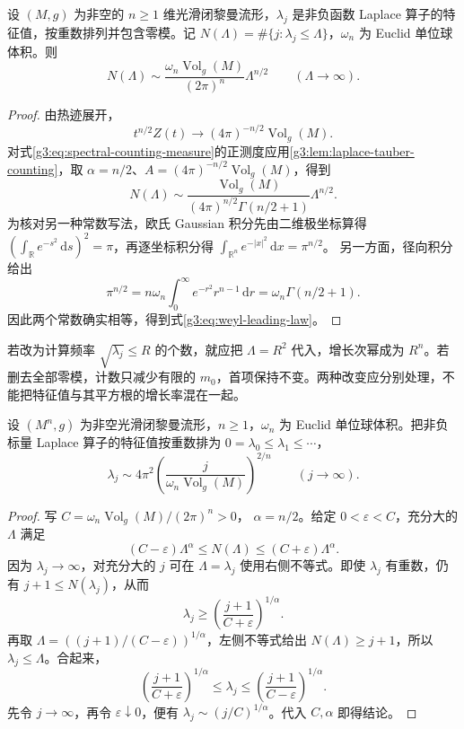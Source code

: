 \begin{theorem}\label{g3:thm:weyl-leading-law}
	设 \((M,g)\) 为非空的 \(n\ge1\) 维光滑闭黎曼流形，\(\lambda_j\) 是非负函数 Laplace 算子的特征值，按重数排列并包含零模。记 \(N(\Lambda)=\#\{j:\lambda_j\le\Lambda\}\)，\(\omega_n\) 为 Euclid 单位球体积。则
	\begin{equation}\label{g3:eq:weyl-leading-law}
		N(\Lambda)\sim
		\frac{\omega_n\operatorname{Vol}_g(M)}{(2\pi)^n}
		\Lambda^{n/2}
		\qquad(\Lambda\to\infty).
	\end{equation}
\end{theorem}
\begin{proof}
	由热迹展开，
	\[
		t^{n/2}Z(t)\longrightarrow
		(4\pi)^{-n/2}\operatorname{Vol}_g(M).
	\]
	对式\eqref{g3:eq:spectral-counting-measure}的正测度应用\cref{g3:lem:laplace-tauber-counting}，取
	\(\alpha=n/2\)、\(A=(4\pi)^{-n/2}\operatorname{Vol}_g(M)\)，得到
	\[
		N(\Lambda)\sim
		\frac{\operatorname{Vol}_g(M)}
		{(4\pi)^{n/2}\Gamma(n/2+1)}\Lambda^{n/2}.
	\]
	为核对另一种常数写法，欧氏 Gaussian 积分先由二维极坐标算得
	\((\int_{\mathbb R}e^{-s^2}\,\mathrm ds)^2=\pi\)，再逐坐标积分得
	\(\int_{\mathbb R^n}e^{-|x|^2}\,\mathrm dx=\pi^{n/2}\)。
	另一方面，径向积分给出
	\[
		\pi^{n/2}
		=n\omega_n\int_0^\infty e^{-r^2}r^{n-1}\,\mathrm dr
		=\omega_n\Gamma(n/2+1).
	\]
	因此两个常数确实相等，得到式\eqref{g3:eq:weyl-leading-law}。
\end{proof}

若改为计算频率 \(\sqrt{\lambda_j}\le R\) 的个数，就应把 \(\Lambda=R^2\) 代入，增长次幂成为 \(R^n\)。若删去全部零模，计数只减少有限的 \(m_0\)，首项保持不变。两种改变应分别处理，不能把特征值与其平方根的增长率混在一起。

\begin{corollary}\label{g3:cor:eigenvalue-weyl-growth}
	设 \((M^n,g)\) 为非空光滑闭黎曼流形，\(n\ge1\)，\(\omega_n\) 为 Euclid 单位球体积。把非负标量 Laplace 算子的特征值按重数排为 \(0=\lambda_0\le\lambda_1\le\cdots\)，
	\begin{equation}\label{g3:eq:eigenvalue-weyl-growth}
		\lambda_j\sim
		4\pi^2\left(\frac{j}{\omega_n\operatorname{Vol}_g(M)}\right)^{2/n}
		\qquad(j\to\infty).
	\end{equation}
\end{corollary}
\begin{proof}
	写 \(C=\omega_n\operatorname{Vol}_g(M)/(2\pi)^n>0\)，
	\(\alpha=n/2\)。给定 \(0<\varepsilon<C\)，充分大的 \(\Lambda\) 满足
	\[
		(C-\varepsilon)\Lambda^\alpha
		\le N(\Lambda)\le(C+\varepsilon)\Lambda^\alpha.
	\]
	因为 \(\lambda_j\to\infty\)，对充分大的 \(j\) 可在 \(\Lambda=\lambda_j\) 使用右侧不等式。即使 \(\lambda_j\) 有重数，仍有
	\(j+1\le N(\lambda_j)\)，从而
	\[
		\lambda_j\ge\left(\frac{j+1}{C+\varepsilon}\right)^{1/\alpha}.
	\]
	再取 \(\Lambda=((j+1)/(C-\varepsilon))^{1/\alpha}\)，左侧不等式给出
	\(N(\Lambda)\ge j+1\)，所以 \(\lambda_j\le\Lambda\)。合起来，
	\[
		\left(\frac{j+1}{C+\varepsilon}\right)^{1/\alpha}
		\le\lambda_j\le
		\left(\frac{j+1}{C-\varepsilon}\right)^{1/\alpha}.
	\]
	先令 \(j\to\infty\)，再令 \(\varepsilon\downarrow0\)，便有
	\(\lambda_j\sim(j/C)^{1/\alpha}\)。代入 \(C,\alpha\) 即得结论。
\end{proof}

